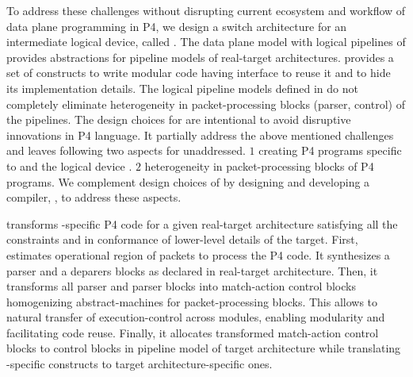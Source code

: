 \documentclass[letterpaper,twocolumn,10pt]{article}
\begin{document}
To address these challenges without disrupting current ecosystem and
workflow of data plane programming in P4, we design a switch
architecture \uarch for an intermediate logical device, called \ucomp.
The data plane model with logical pipelines of \ucomp provides
abstractions for pipeline models of real-target architectures.  \uarch
provides a set of constructs to write modular code having interface to
reuse it and to hide its implementation details.  The logical pipeline
models defined in \uarch do not completely eliminate heterogeneity in
packet-processing blocks (parser, control) of the pipelines.
The design choices for \uarch are intentional to avoid disruptive
innovations in P4 language.  It partially address the above mentioned
challenges and leaves following two aspects for unaddressed.  $1$
creating P4 programs specific to \uarch and the logical device \ucomp.
$2$ heterogeneity in packet-processing blocks of P4 programs.  We
complement design choices of \uarch by designing and developing a
compiler, \ucomp, to address these aspects.


\ucomp transforms \uarch-specific P4 code for a given real-target
architecture satisfying all the constraints and in conformance of
lower-level details of the target.  First, \ucomp estimates
operational region of packets to process the P4 code.  It synthesizes
a parser and a deparers blocks as declared in real-target
architecture.  Then, it transforms all parser and parser blocks into
match-action control blocks homogenizing abstract-machines for
packet-processing blocks.  This allows to natural transfer of
execution-control across modules, enabling modularity and facilitating
code reuse.  Finally, it allocates transformed match-action control
blocks to control blocks in pipeline model of target architecture
while translating \uarch-specific constructs to target
architecture-specific ones.






\end{document}
